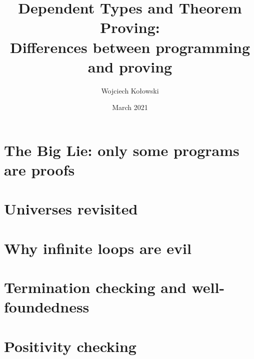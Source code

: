 \documentclass{beamer}
\title{Dependent Types and Theorem Proving: \\Differences between programming and proving}
\author{Wojciech Kołowski}
\date{March 2021}
\begin{document}
\frame{\titlepage}
\frame{\tableofcontents}

\section{The Big Lie: only some programs are proofs}

\section{Universes revisited}

\section{Why infinite loops are evil}

\section{Termination checking and well-foundedness}


\section{Positivity checking}

\end{document}
